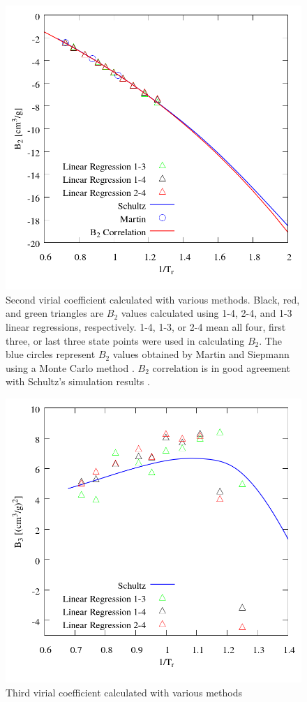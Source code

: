\documentclass[5p,times]{elsarticle}
\begin{document}
\begin{figure}
\includegraphics[scale=0.3]{Figures/TraPPE-C2-B2.png}
\caption{Second virial coefficient calculated with various methods. Black, red, and green triangles are $B_2$ values calculated using 1-4, 2-4, and 1-3 linear regressions, respectively. 1-4, 1-3, or 2-4 mean all four, first three, or last three state points were used in calculating $B_2$. The blue circles represent $B_2$ values obtained by Martin and Siepmann \cite{Martin1998} using a Monte Carlo method \cite{Harismiadis1994}. $B_2$ correlation is in good agreement with Schultz's simulation results \cite{Schultz2010a}.}
\label{fig:TraPPE-C2-B2}
\end{figure}

\begin{figure}
\includegraphics[scale=0.3]{Figures/TraPPE-C2-B3.png}
\caption{Third virial coefficient calculated with various methods}
\label{fig:TraPPE-C2-B3}
\end{figure}
\end{document}
